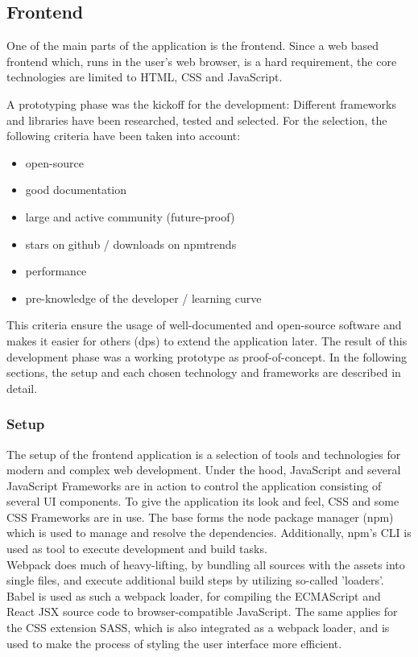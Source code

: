 \documentclass[a4paper,11pt,pdftex,halfparskip,cleardoubleempty]{scrbook}
\begin{document}
\subsection{Frontend}
One of the main parts of the application is the frontend. Since a web based frontend which, runs in the user's web browser, is a hard requirement, the core technologies are limited to HTML, CSS and JavaScript.
\par
A prototyping phase was the kickoff for the development: Different frameworks and libraries have been researched, tested and selected. For the selection, the following criteria have been taken into account:
\begin{itemize}
	\item open-source
	\item good documentation
	\item large and active community (future-proof)
	\item stars on github / downloads on npmtrends
	\item performance
	\item pre-knowledge of the developer / learning curve
\end{itemize}
This criteria ensure the usage of well-documented and open-source software and makes it easier for others (dps) to extend the application later.
The result of this development phase was a working prototype as proof-of-concept.
In the following sections, the setup and each chosen technology and frameworks are described in detail.


\subsubsection{Setup}

The setup of the frontend application is a selection of tools and technologies for modern and complex web development.
Under the hood, JavaScript and several JavaScript Frameworks are in action to control the application consisting of several UI components. To give the application its look and feel, CSS and some CSS Frameworks are in use.
The base forms the node package manager (npm) which is used to manage and resolve the dependencies. Additionally, npm's CLI is used as tool to execute development and build tasks. \\
Webpack does much of heavy-lifting, by bundling all sources with the assets into single files, and execute additional build steps by utilizing so-called 'loaders'.
Babel is used as such a webpack loader, for compiling the ECMAScript and React JSX source code to browser-compatible JavaScript.
The same applies for the CSS extension SASS, which is also integrated as a webpack loader, and is used to make the process of styling the user interface more efficient.
\end{document}
